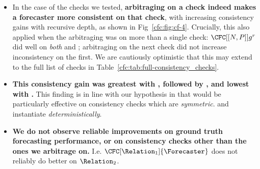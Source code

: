 \begin{itemize}
    \item In the case of the checks we tested, \textbf{arbitraging on a check indeed makes a forecaster more consistent on that check}, with increasing consistency gains with recursive depth, as shown in Fig~\ref{cfc:fig:cf-4}. Crucially, this also applied when the arbitraging was on more than a single check: $\CFC[[N,P]]{g}^r$ did well on \emph{both} \NegChecker{} and \ParaphraseChecker{}; arbitraging on the next check did not increase inconsistency on the first. We are cautiously optimistic that this may extend to the full list of checks in Table~\ref{cfc:tab:full-consistency_checks}.
    \item \textbf{This consistency gain was greatest with \NegChecker{}, followed by \ParaphraseChecker{}, and lowest with \ExpectedEvidenceChecker{}.} This finding is in line with our hypothesis in  that \CFCaster{} would be particularly effective on consistency checks which are \emph{symmetric}. and instantiate \emph{deterministically}.
    \item \textbf{We do not observe reliable improvements on ground truth forecasting performance, or on consistency checks other than the ones we arbitrage on.}
    I.e. $\CFC[\Relation_1]{\Forecaster}$ does not reliably do better on $\Relation_2$.
\end{itemize}

